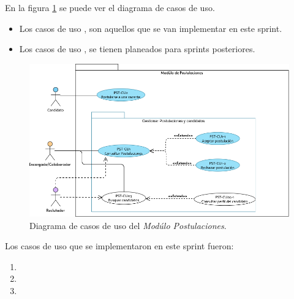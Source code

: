 En la figura \ref{dcu:DCUPST} se puede ver el diagrama de casos de uso.
\begin{itemize}
    \item Los casos de uso \IUazul{} , son aquellos que se van implementar en este sprint.
    \item Los casos de uso \IUblanco{}, se tienen planeados para sprints posteriores.
\end{itemize} 

\begin{figure}[H]
    \begin{center}
        \includegraphics[width=.7\textwidth]{sprints/imagenes/DCUPST.png}
    \end{center}
    \caption{Diagrama de casos de uso del \textit{Modúlo Postulaciones}.}
    \label{dcu:DCUPST}
\end{figure}

Los casos de uso que se implementaron en este sprint fueron:
\begin{enumerate}
    \item {}
    \item {}
    \item {}
\end{enumerate} 



